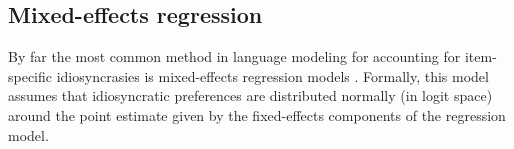 \documentclass[10pt,letterpaper]{article}
\begin{document}
%



\subsection{Mixed-effects regression}
By far the most common method in language modeling for accounting for item-specific idiosyncrasies is mixed-effects regression models \citep{TFlorianJaeger:2008ev}. Formally, this model assumes that idiosyncratic preferences are distributed normally (in logit space) around the point estimate given by the fixed-effects components of the regression model.
\end{document}
